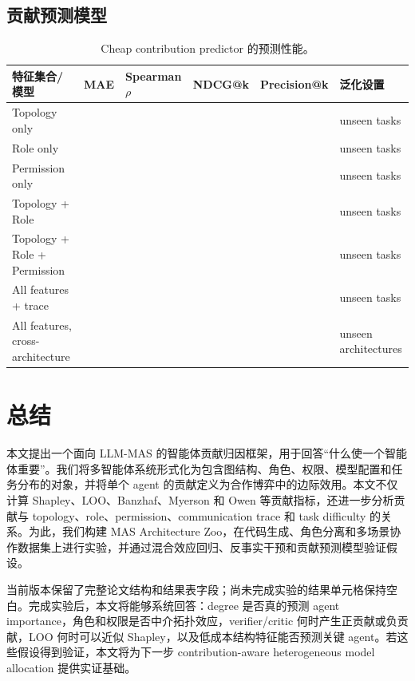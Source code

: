 \documentclass[UTF8,a4paper,11pt]{ctexart}
\begin{document}
\subsection{贡献预测模型}

\begin{table}[H]
\centering
\caption{Cheap contribution predictor 的预测性能。}
\label{tab:predictor}
\begin{tabularx}{\textwidth}{L{0.22\textwidth}C{0.12\textwidth}C{0.12\textwidth}C{0.12\textwidth}C{0.12\textwidth}Y}
\toprule
特征集合/模型 & MAE & Spearman $\rho$ & NDCG@k & Precision@k & 泛化设置 \\
\midrule
Topology only &  &  &  &  & unseen tasks \\
Role only &  &  &  &  & unseen tasks \\
Permission only &  &  &  &  & unseen tasks \\
Topology + Role &  &  &  &  & unseen tasks \\
Topology + Role + Permission &  &  &  &  & unseen tasks \\
All features + trace &  &  &  &  & unseen tasks \\
All features, cross-architecture &  &  &  &  & unseen architectures \\
\bottomrule
\end{tabularx}
\end{table}



\section{总结}

本文提出一个面向 LLM-MAS 的智能体贡献归因框架，用于回答“什么使一个智能体重要”。我们将多智能体系统形式化为包含图结构、角色、权限、模型配置和任务分布的对象，并将单个 agent 的贡献定义为合作博弈中的边际效用。本文不仅计算 Shapley、LOO、Banzhaf、Myerson 和 Owen 等贡献指标，还进一步分析贡献与 topology、role、permission、communication trace 和 task difficulty 的关系。为此，我们构建 MAS Architecture Zoo，在代码生成、角色分离和多场景协作数据集上进行实验，并通过混合效应回归、反事实干预和贡献预测模型验证假设。

当前版本保留了完整论文结构和结果表字段；尚未完成实验的结果单元格保持空白。完成实验后，本文将能够系统回答：degree 是否真的预测 agent importance，角色和权限是否中介拓扑效应，verifier/critic 何时产生正贡献或负贡献，LOO 何时可以近似 Shapley，以及低成本结构特征能否预测关键 agent。若这些假设得到验证，本文将为下一步 contribution-aware heterogeneous model allocation 提供实证基础。


\end{document}
